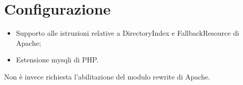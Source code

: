 \section{Configurazione}
\begin{itemize}
\item Supporto alle istruzioni relative a DirectoryIndex e FallbackResource di Apache;
\item Estensione mysqli di PHP.
\end{itemize}
Non è invece richiesta l'abilitazione del modulo rewrite di Apache.